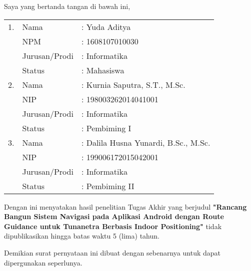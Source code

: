 \suratpernyataanpage

\noindent Saya yang bertanda tangan di bawah ini,

\begin{table}[H]
    \begin{tabular}{lll}
    \multicolumn{1}{c}{1.} & Nama          & : Yuda Aditya                        \\
    \multicolumn{1}{c}{}   & NPM           & : 1608107010030                      \\
    \multicolumn{1}{c}{}   & Jurusan/Prodi & : Informatika                        \\
    \multicolumn{1}{c}{}   & Status        & : Mahasiswa                          \\
    2.                     & Nama          & : Kurnia Saputra, S.T., M.Sc.        \\
                           & NIP           & : 198003262014041001                 \\
                           & Jurusan/Prodi & : Informatika                        \\
                           & Status        & : Pembiming I                        \\
    3.                     & Nama          & : Dalila Husna Yunardi, B.Sc., M.Sc. \\
                           & NIP           & : 199006172015042001                 \\
                           & Jurusan/Prodi & : Informatika                        \\
                           & Status        & : Pembiming II                       
    \end{tabular}
    \end{table}


\noindent Dengan ini menyatakan hasil penelitian Tugas Akhir yang berjudul \textbf{"Rancang Bangun Sistem Navigasi pada Aplikasi Android dengan Route Guidance untuk Tunanetra Berbasis Indoor Positioning"} tidak dipublikasikan hingga batas waktu 5 (lima) tahun.

\vspace{0.2cm}

\noindent Demikian surat pernyataan ini dibuat dengan sebenarnya untuk dapat dipergunakan seperlunya.

